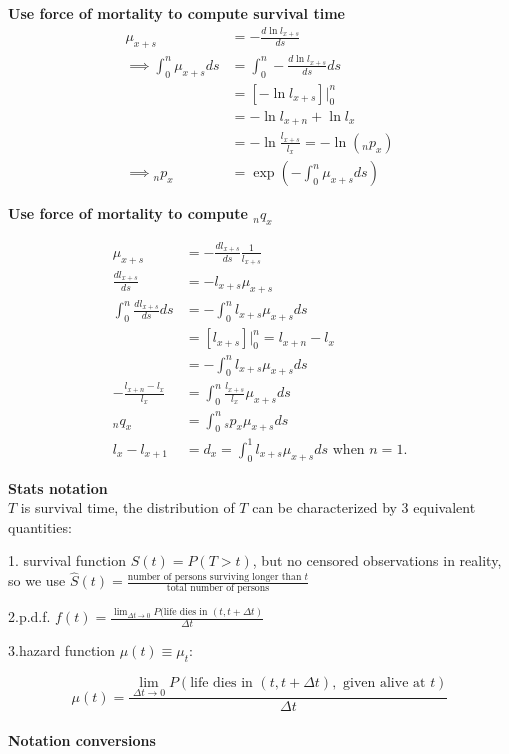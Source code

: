 \documentclass[a4paper, 11pt, twoside]{article}
\begin{document}
\textbf{Use force of mortality to compute survival time}
\[\begin{split}
\mu_{x+s}&=-\frac{d\ln l_{x+s}}{ds}\\
\implies \int^n_0\mu_{x+s}ds&=\int^n_0-\frac{d\ln l_{x+s}}{ds}ds\\
&=[-\ln l_{x+s}]\Bigg\rvert^n_0\\
&=-\ln l_{x+n}+\ln l_x\\
&=-\ln\frac{l_{x+s}}{l_x}=-\ln({}_np_x)\\
\implies {}_np_x&=\exp\left(-\int^n_0\mu_{x+s}ds\right)	
\end{split}
\]

\textbf{Use force of mortality to compute ${}_nq_x$}

\[\begin{split}
	\mu_{x+s}&= -\frac{dl_{x+s}}{ds}\frac{1}{l_{x+s}}\\
	\frac{dl_{x+s}}{ds}&=-l_{x+s}\mu_{x+s}\\
	\int^n_0\frac{dl_{x+s}}{ds}ds&=-\int^n_0 l_{x+s}\mu_{x+s}ds\\
	&=\left[l_{x+s}\right]\Bigg\rvert^n_0=l_{x+n}-l_x\\
	&=-\int^n_0l_{x+s}\mu_{x+s}ds\\
	-\frac{l_{x+n}-l_x}{l_x}&=\int^n_0\frac{l_{x+s}}{l_x}\mu_{x+s}ds\\
	{}_nq_x&=\int^n_0{}_sp_x\mu_{x+s}ds\\
	l_x-l_{x+1}&=d_x=\int^1_0l_{x+s}\mu_{x+s}ds \text{ when $n=1$.}
\end{split}
\]

\textbf{Stats notation}\\

$T$ is survival time, the distribution of $T$ can be characterized by 3 equivalent quantities:

1. survival function $S(t)=P(T>t)$, but no censored observations in reality, so we use $\hat{S}(t)=\frac{\text{number of persons surviving longer than }t}{\text{total number of persons}}$

2.p.d.f. $f(t)=\frac{\lim_{\Delta t\to 0}P(\text{life dies in }(t,t+\Delta t)}{\Delta t}$

3.hazard function $\mu(t) \equiv \mu_t$:

\[\mu(t)=\frac{\lim_{\Delta t\to 0}P(\text{life dies in }(t,t+\Delta t),\text{ given alive at }t)}{\Delta t}\]\\

\textbf{Notation conversions}\\
\end{document}

